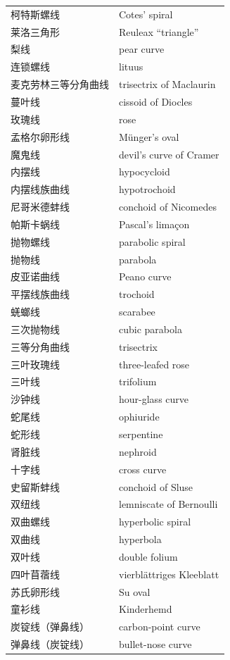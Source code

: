 {\begin{longtable}{@{}>{\raggedright\arraybackslash}p{45mm}@{\hspace{5mm}}>{\raggedright\arraybackslash}p{52mm}@{}}
  柯特斯螺线 & Cotes' spiral \\
  莱洛三角形 & Reuleax ``triangle'' \\
  梨线 & pear curve \\
  连锁螺线 & lituus \\
  麦克劳林三等分角曲线 & trisectrix of Maclaurin \\
  蔓叶线 & cissoid of Diocles \\
  玫瑰线 & rose \\
  孟格尔卵形线 & Münger's oval \\
  魔鬼线 & devil's curve of Cramer \\
  内摆线 & hypocycloid \\
  内摆线族曲线 & hypotrochoid \\
  尼哥米德蚌线 & conchoid of Nicomedes \\
  帕斯卡蜗线 & Pascal's limaçon \\
  抛物螺线 & parabolic spiral \\
  抛物线 & parabola \\
  皮亚诺曲线 & Peano curve \\
  平摆线族曲线 & trochoid \\
  蜣螂线 & scarabee \\
  三次抛物线 & cubic parabola \\
  三等分角曲线 & trisectrix \\
  三叶玫瑰线 & three-leafed rose \\
  三叶线 & trifolium \\
  沙钟线 & hour-glass curve \\
  蛇尾线 & ophiuride \\
  蛇形线 & serpentine \\
  肾脏线 & nephroid \\
  十字线 & cross curve \\
  史留斯蚌线 & conchoid of Sluse \\
  双纽线 & lemniscate of Bernoulli \\
  双曲螺线 & hyperbolic spiral \\
  双曲线 & hyperbola \\
  双叶线 & double folium \\
  四叶苜蓿线 & vierblättriges Kleeblatt \\
  苏氏卵形线 & Su oval \\
  童衫线 & Kinderhemd \\
  炭锭线（弹鼻线） & carbon-point curve \\
  弹鼻线（炭锭线） & bullet-nose curve \\

\end{longtable}}
